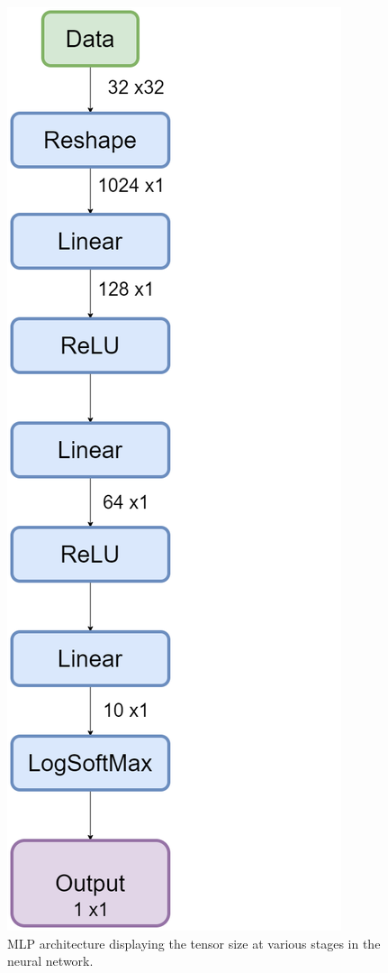 \documentclass[conference]{IEEEtran}
\begin{document}
\begin{figure}[!h]
\includegraphics[scale = 0.2, keepaspectratio]{NNArchitecture}
\caption{MLP architecture displaying the tensor size at various stages in the neural network. }
\label{fig:MLPArch}

\end{figure}
\end{document}
